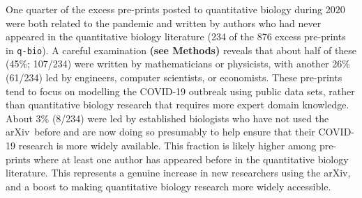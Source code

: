 \documentclass[]{rsos}%
\newcommand{\arxiv}{arXiv}
\newcommand{\change}[1]{\textbf{#1}}
\begin{document}
One quarter of the excess pre-prints posted to quantitative biology during 2020 were both related to the pandemic and written by authors who had never appeared in the quantitative biology literature (234 of the 876 excess pre-prints in \texttt{q-bio}). A careful examination \change{(see Methods)} reveals that about half of these (45\%; 107/234) were written by mathematicians or physicists, with another 26\% (61/234) led by engineers, computer scientists, or economists. These pre-prints tend to focus on modelling the COVID-19 outbreak using public data sets, rather than quantitative biology research that requires more expert domain knowledge. About 3\% (8/234) were led by established biologists who have not used the \arxiv\ before and are now doing so presumably to help ensure that their COVID-19 research is more widely available. This fraction is likely higher among pre-prints where at least one author has appeared before in the quantitative biology literature. This represents a genuine increase in new researchers using the \arxiv, and a boost to making quantitative biology research more widely accessible. 










\end{document}
